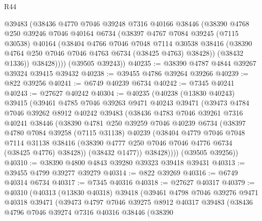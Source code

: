 \begin{lexlean}{R44}
\begin{coremodule}
{          @39483
          (@38436
            @4770
            @7046
            @39248
            @7316
            @40166
            @38446
            (@38390
              @4768
              @250
              @39246
              @7046
              @40164
              @6734
              (@38397
                @4767
                @7084
                @39245
                (@7115 @30538)
                @40164
                (@38404
                  @4766
                  @7046
                  @7048
                  @7114
                  @30538
                  @38416
                  (@38390 @4764 @250 @7046 @7046 @4763 @6734 (@38425 @4763) @38428))
                (@38432 @1336))
              @38428))))
      (@39505 @39243))
@40235 := @38390 @4787 @4844 @39267 @39324 @39415 @39432
@40238 := @39455 @4786 @39264 @39266
@40239 := @822 @39256
@40241 := @6749 @40239 @6734
@40242 := @7345 @40241
@40243 := @27627 @40242
@40304 := @40235
    (@40238
      (@13830 @40243)
      @39415
      (@39461
        @4785
        @7046
        @39263
        @9471
        @40243
        @39471
        (@39473
          @4784
          @7046
          @39262
          @8912
          @40242
          @39483
          (@38436
            @4783
            @7046
            @39261
            @7316
            @40241
            @38446
            (@38390
              @4781
              @250
              @39259
              @7046
              @40239
              @6734
              (@38397
                @4780
                @7084
                @39258
                (@7115 @31138)
                @40239
                (@38404
                  @4779
                  @7046
                  @7048
                  @7114
                  @31138
                  @38416
                  (@38390 @4777 @250 @7046 @7046 @4776 @6734 (@38425 @4776) @38428))
                (@38432 @1477))
              @38428))))
      (@39505 @39256))
@40310 := @38390 @4800 @4843 @39280 @39323 @39418 @39431
@40313 := @39455 @4799 @39277 @39279
@40314 := @822 @39269
@40316 := @6749 @40314 @6734
@40317 := @7345 @40316
@40318 := @27627 @40317
@40379 := @40310
    (@40313
      (@13830 @40318)
      @39418
      (@39461
        @4798
        @7046
        @39276
        @9471
        @40318
        @39471
        (@39473
          @4797
          @7046
          @39275
          @8912
          @40317
          @39483
          (@38436
            @4796
            @7046
            @39274
            @7316
            @40316
            @38446
            (@38390
}
\end{coremodule}
\end{lexlean}
